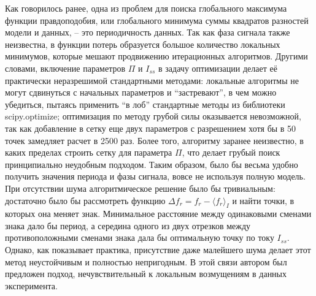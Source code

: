 \documentclass[14pt, a4paper]{extreport}
\numberwithin{equation}{section}
\begin{document}
Как говорилось ранее, одна из проблем для поиска глобального максимума функции правдоподобия, или глобального минимума суммы квадратов разностей модели и данных, -- это периодичность данных. Так как фаза сигнала также неизвестна, в функции потерь образуется большое количество локальных минимумов, которые мешают продвижению итерационных алгоритмов. Другими словами, включение параметров $\Pi$ и $I_{ss}$ в задачу оптимизации делает её практически неразрешимой стандартными методами: локальные алгоритмы не могут сдвинуться с начальных параметров и ``застревают'', в чем можно убедиться, пытаясь применить ``в лоб'' стандартные методы из библиотеки  \foreignlanguage{english}{scipy.optimize}; оптимизация по методу грубой силы оказывается невозможной, так как добавление в сетку еще двух параметров с разрешением хотя бы в 50 точек замедляет расчет в 2500 раз. Более того, алгоритму заранее неизвестно, в каких пределах строить сетку для параметра $\Pi$, что делает грубый поиск принципиально неудобным подходом. Таким образом, было бы весьма удобно получить значения периода и фазы сигнала, вовсе не используя полную модель. При отсутствии шума алгоритмическое решение было бы тривиальным: достаточно было бы рассмотреть функцию $\Delta f_r = f_r-\langle f_r \rangle_{I}$ и найти точки, в которых она меняет знак. Минимальное расстояние между одинаковыми сменами знака дало бы период, а середина одного из двух отрезков между противоположными сменами знака дала бы оптимальную точку по току $I_{ss}$. Однако, как показывает практика, присутствие даже малейшего шума делает этот метод неустойчивым и полностью непригодным. В этой связи автором был предложен подход, нечувствительный к локальным возмущениям в данных эксперимента.
\end{document}
